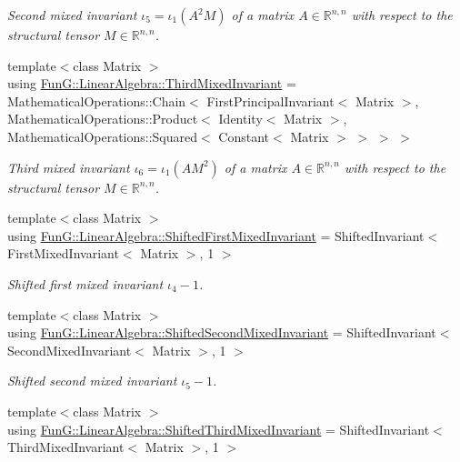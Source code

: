 \begin{DoxyCompactItemize}
\begin{DoxyCompactList}\small\item\em Second mixed invariant $ \iota_5=\iota_1(A^2M) $ of a matrix $A\in\mathbb{R}^{n,n}$ with respect to the structural tensor $M\in\mathbb{R}^{n,n}$. \end{DoxyCompactList}\item 
\hypertarget{group__InvariantGroup_gaaa32f861a2c51dcf42b5dc6996d0ac4c}{{\footnotesize template$<$class Matrix $>$ }\\using \hyperlink{group__InvariantGroup_gaaa32f861a2c51dcf42b5dc6996d0ac4c}{Fun\-G\-::\-Linear\-Algebra\-::\-Third\-Mixed\-Invariant} = Mathematical\-Operations\-::\-Chain$<$ First\-Principal\-Invariant$<$ Matrix $>$, Mathematical\-Operations\-::\-Product$<$ Identity$<$ Matrix $>$, Mathematical\-Operations\-::\-Squared$<$ Constant$<$ Matrix $>$ $>$ $>$ $>$}\label{group__InvariantGroup_gaaa32f861a2c51dcf42b5dc6996d0ac4c}

\begin{DoxyCompactList}\small\item\em Third mixed invariant $ \iota_6=\iota_1(AM^2) $ of a matrix $A\in\mathbb{R}^{n,n}$ with respect to the structural tensor $M\in\mathbb{R}^{n,n}$. \end{DoxyCompactList}\item 
\hypertarget{group__InvariantGroup_ga064a6a5d7dab925d400a58bfc66cef3b}{{\footnotesize template$<$class Matrix $>$ }\\using \hyperlink{group__InvariantGroup_ga064a6a5d7dab925d400a58bfc66cef3b}{Fun\-G\-::\-Linear\-Algebra\-::\-Shifted\-First\-Mixed\-Invariant} = Shifted\-Invariant$<$ First\-Mixed\-Invariant$<$ Matrix $>$, 1 $>$}\label{group__InvariantGroup_ga064a6a5d7dab925d400a58bfc66cef3b}

\begin{DoxyCompactList}\small\item\em Shifted first mixed invariant $ \iota_4 - 1 $. \end{DoxyCompactList}\item 
\hypertarget{group__InvariantGroup_gaf4200323d20d6ba1f82fdb92c16fc7fa}{{\footnotesize template$<$class Matrix $>$ }\\using \hyperlink{group__InvariantGroup_gaf4200323d20d6ba1f82fdb92c16fc7fa}{Fun\-G\-::\-Linear\-Algebra\-::\-Shifted\-Second\-Mixed\-Invariant} = Shifted\-Invariant$<$ Second\-Mixed\-Invariant$<$ Matrix $>$, 1 $>$}\label{group__InvariantGroup_gaf4200323d20d6ba1f82fdb92c16fc7fa}

\begin{DoxyCompactList}\small\item\em Shifted second mixed invariant $ \iota_5 - 1 $. \end{DoxyCompactList}\item 
\hypertarget{group__InvariantGroup_ga2806020644df563f33249bbfa9e67df3}{{\footnotesize template$<$class Matrix $>$ }\\using \hyperlink{group__InvariantGroup_ga2806020644df563f33249bbfa9e67df3}{Fun\-G\-::\-Linear\-Algebra\-::\-Shifted\-Third\-Mixed\-Invariant} = Shifted\-Invariant$<$ Third\-Mixed\-Invariant$<$ Matrix $>$, 1 $>$}\label{group__InvariantGroup_ga2806020644df563f33249bbfa9e67df3}


\end{DoxyCompactItemize}
